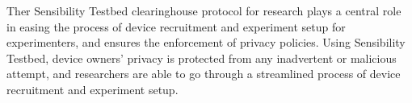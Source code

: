 \smallskip
Ther Sensibility Testbed clearinghouse protocol for research plays a central role in
easing the process of device recruitment and experiment setup for experimenters, 
and ensures the enforcement of privacy policies. 
%
%
Using Sensibility Testbed, device owners' privacy is protected
from any inadvertent or malicious attempt, and researchers 
are able to go through a streamlined process of device 
recruitment and experiment setup.

